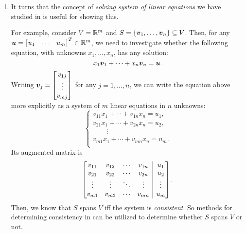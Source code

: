 \begin{enumerate}
\item It turns that the concept of \emph{solving system of linear equations} we
have studied in  is useful for showing this.

For example, consider \(V=\mathbb{R}^m\) and
\(S=\{\vb*{v}_1,\dotsc,\vb*{v}_n\}\subseteq V\). Then, for any
\(\vect{u}=\mqty[u_1&\cdots&u_m]^{T}\in\R^m\), we need to investigate whether
the following equation, with unknowns \(x_1,\dotsc,x_n\), has any solution:
\[
x_1\vb*{v}_1+\dotsb+x_n\vb*{v}_n=\vb*{u}.
\]
Writing \(\vect{v}_j=\mqty[v_{1j}\\\vdots\\v_{mj}]\) for any \(j=1,\dotsc,n\),
we can write the equation above more explicitly as a system of \(m\) linear
equations in \(n\) unknowns:
\[
\begin{cases}
v_{11}x_1+\dotsb+v_{1n}x_n=u_1,\\
v_{21}x_1+\dotsb+v_{2n}x_n=u_2,\\
\qquad\vdots\\
v_{m1}x_1+\dotsb+v_{mn}x_n=u_m.\\
\end{cases}
\]
Its augmented matrix is
\[
\left[\begin{array}{@{}cccc|c@{}}
v_{11}&v_{12}&\cdots&v_{1n}&u_{1}\\
v_{21}&v_{22}&\cdots&v_{2n}&u_{2}\\
\vdots&\vdots&\ddots&\vdots&\vdots\\
v_{m1}&v_{m2}&\cdots&v_{mn}&u_{m}\\
\end{array}\right].
\]
Then, we know that \(S\) spans \(V\) iff the system is \emph{consistent}. So
methods for determining consistency in  can be
utilized to determine whether \(S\) spans \(V\) or not.
\end{enumerate}
